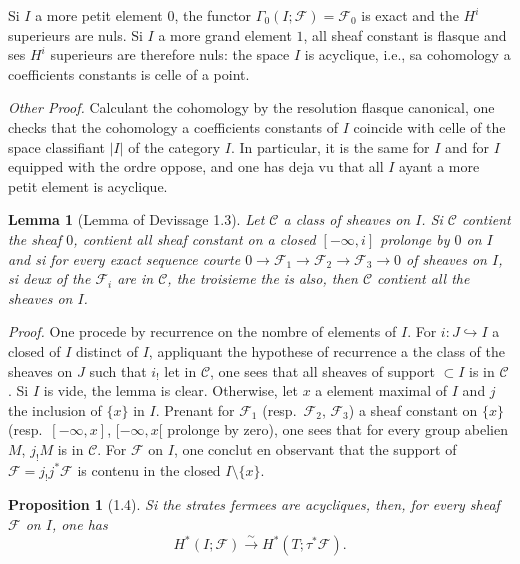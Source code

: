 \documentclass[11pt,a4paper]{article}
\theoremstyle{plain}
\newtheorem{lemma}[theorem]{Lemma}
\newtheorem{proposition}[theorem]{Proposition}
\theoremstyle{definition}
\begin{document}
Si $I$ a more petit element $0$, the functor $\Gamma_0(I;\mathcal{F}) = \mathcal{F}_0$ is exact and the $H^i$ superieurs are nuls. Si $I$ a more grand element $1$, all sheaf constant is flasque and ses $H^i$ superieurs are therefore nuls: the space $I$ is acyclique, i.e., sa cohomology a coefficients constants is celle of a point.

\textit{Other Proof.} Calculant the cohomology by the resolution flasque canonical, one checks that the cohomology a coefficients constants of $I$ coincide with celle of the space classifiant $|I|$ of the category $I$. In particular, it is the same for $I$ and for $I$ equipped with the ordre oppose, and one has deja vu that all $I$ ayant a more petit element is acyclique.

\begin{lemma}[Lemma of Devissage 1.3]\label{lem:1.3}
Let $\mathcal{C}$ a class of sheaves on $I$. Si $\mathcal{C}$ contient the sheaf $0$, contient all sheaf constant on a closed $[-\infty,i]$ prolonge by $0$ on $I$ and si for every exact sequence courte $0 \to \mathcal{F}_1 \to \mathcal{F}_2 \to \mathcal{F}_3 \to 0$ of sheaves on $I$, si deux of the $\mathcal{F}_i$ are in $\mathcal{C}$, the troisieme the is also, then $\mathcal{C}$ contient all the sheaves on $I$.
\end{lemma}

\noindent\textit{Proof.} One procede by recurrence on the nombre of elements of $I$. For $i: J \hookrightarrow I$ a closed of $I$ distinct of $I$, appliquant the hypothese of recurrence a the class of the sheaves on $J$ such that $i_!$ let in $\mathcal{C}$, one sees that all sheaves of support $\subset I$ is in $\mathcal{C}$. Si $I$ is vide, the lemma is clear. Otherwise, let $x$ a element maximal of $I$ and $j$ the inclusion of $\{x\}$ in $I$. Prenant for $\mathcal{F}_1$ (resp.~$\mathcal{F}_2$, $\mathcal{F}_3$) a sheaf constant on $\{x\}$ (resp.~$[-\infty,x]$, $[-\infty,x[$ prolonge by zero), one sees that for every group abelien $M$, $j_!M$ is in $\mathcal{C}$. For $\mathcal{F}$ on $I$, one conclut en observant that the support of $\mathcal{F} = j_!j^*\mathcal{F}$ is contenu in the closed $I \setminus \{x\}$.

\begin{proposition}[1.4]\label{prop:1.4}
Si the strates fermees are acycliques, then, for every sheaf $\mathcal{F}$ on $I$, one has
\begin{equation}\label{eq:1.4.1}
H^*(I;\mathcal{F}) \xrightarrow{\sim} H^*(T;\tau^*\mathcal{F}).
\tag{1.4.1}
\end{equation}
\end{proposition}
\end{document}
